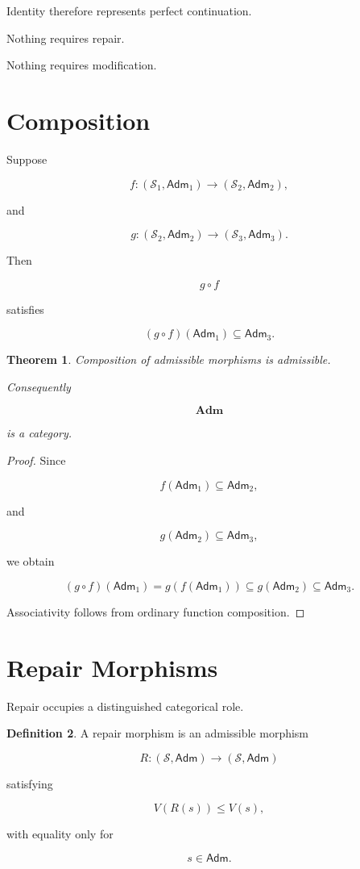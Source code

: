 \documentclass[11pt,oneside]{book}
\numberwithin{equation}{chapter}
\theoremstyle{definition}
\newtheorem{definition}{Definition}[chapter]
\theoremstyle{plain}
\newtheorem{theorem}[definition]{Theorem}
\newcommand{\State}{\mathcal{S}}
\newcommand{\Adm}{\mathsf{Adm}}
\begin{document}
Identity therefore represents perfect continuation.

Nothing requires repair.

Nothing requires modification.

\section{Composition}

Suppose

\[
f:
(\State_1,\Adm_1)
\rightarrow
(\State_2,\Adm_2),
\]

and

\[
g:
(\State_2,\Adm_2)
\rightarrow
(\State_3,\Adm_3).
\]

Then

\[
g\circ f
\]

satisfies

\[
(g\circ f)(\Adm_1)
\subseteq
\Adm_3.
\]

\begin{theorem}

Composition of admissible morphisms is admissible.

Consequently

\[
\mathbf{Adm}
\]

is a category.

\end{theorem}

\begin{proof}

Since

\[
f(\Adm_1)
\subseteq
\Adm_2,
\]

and

\[
g(\Adm_2)
\subseteq
\Adm_3,
\]

we obtain

\[
(g\circ f)(\Adm_1)
=
g(f(\Adm_1))
\subseteq
g(\Adm_2)
\subseteq
\Adm_3.
\]

Associativity follows from ordinary function composition.

\end{proof}

\section{Repair Morphisms}

Repair occupies a distinguished categorical role.

\begin{definition}

A repair morphism is an admissible morphism

\[
R:
(\State,\Adm)
\rightarrow
(\State,\Adm)
\]

satisfying

\[
V(R(s))
\le
V(s),
\]

with equality only for

\[
s
\in
\Adm.
\]

\end{definition}
\end{document}
